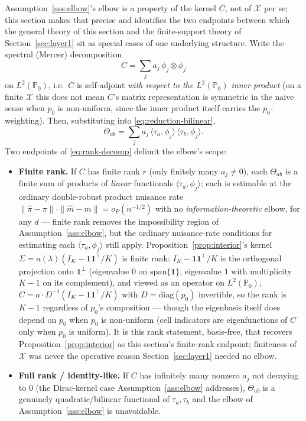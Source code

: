 \documentclass[11pt]{article}
\theoremstyle{plain}
\theoremstyle{definition}
\theoremstyle{remark}
\newcommand{\PP}{\mathbb{P}}
\newcommand{\cX}{\mathcal{X}}
\begin{document}
Assumption~\ref{ass:elbow}'s elbow is a property of the kernel $C$, not of $\cX$ per
se; this section makes that precise and identifies the two endpoints between which
the general theory of this section and the finite-support theory of
Section~\ref{sec:layer1} sit as special cases of one underlying structure. Write the
spectral (Mercer) decomposition
\begin{equation}\label{eq:rank-decomp-kernel}
    C = \sum_j a_j\,\phi_j\otimes\phi_j
\end{equation}
on $L^2(\PP_0)$, i.e.\ $C$ is self-adjoint \emph{with respect to the $L^2(\PP_0)$
inner product} (on a finite $\cX$ this does not mean $C$'s matrix representation is
symmetric in the naive sense when $p_0$ is non-uniform, since the inner product
itself carries the $p_0$-weighting). Then, substituting into
\eqref{eq:reduction-bilinear},
\begin{equation}\label{eq:rank-decomp}
    \Theta_{ab} = \sum_j a_j\,\langle\tau_a,\phi_j\rangle\,\langle\tau_b,\phi_j\rangle.
\end{equation}
Two endpoints of \eqref{eq:rank-decomp} delimit the elbow's scope:
\begin{itemize}
    \item \textbf{Finite rank.} If $C$ has finite rank $r$ (only finitely many
    $a_j\ne0$), each $\Theta_{ab}$ is a finite sum of products of \emph{linear}
    functionals $\langle\tau_a,\phi_j\rangle$; each is estimable at the ordinary
    double-robust product nuisance rate $\|\hat\pi-\pi\|\cdot\|\hat m-m\|=o_P(n^{-1/2})$
    with no \emph{information-theoretic} elbow, for any $d$ --- finite rank removes
    the impossibility region of Assumption~\ref{ass:elbow}, but the ordinary
    nuisance-rate conditions for estimating each $\langle\tau_a,\phi_j\rangle$ still
    apply. Proposition~\ref{prop:interior}'s kernel $\Sigma=a(\lambda)(I_K-\mathbf1\mathbf1^\top/K)$
    is finite rank: $I_K-\mathbf1\mathbf1^\top/K$ is the orthogonal projection onto
    $\mathbf1^\perp$ (eigenvalue $0$ on $\mathrm{span}\{\mathbf1\}$, eigenvalue $1$
    with multiplicity $K-1$ on its complement), and viewed as an operator on
    $L^2(\PP_0)$, $C=a\cdot D^{-1}(I_K-\mathbf1\mathbf1^\top/K)$ with $D=\mathrm{diag}(p_0)$
    invertible, so the rank is $K-1$ regardless of $p_0$'s composition --- though the
    eigenbasis itself does depend on $p_0$ when $p_0$ is non-uniform (cell indicators
    are eigenfunctions of $C$ only when $p_0$ is uniform). It is this rank statement,
    basis-free, that recovers Proposition~\ref{prop:interior} as this section's
    finite-rank endpoint; finiteness of $\cX$ was never the operative reason
    Section~\ref{sec:layer1} needed no elbow.
    \item \textbf{Full rank / identity-like.} If $C$ has infinitely many nonzero
    $a_j$ not decaying to $0$ (the Dirac-kernel case Assumption~\ref{ass:elbow}
    addresses), $\Theta_{ab}$ is a genuinely quadratic/bilinear functional of
    $\tau_a,\tau_b$ and the elbow of Assumption~\ref{ass:elbow} is unavoidable.
\end{itemize}
\end{document}

